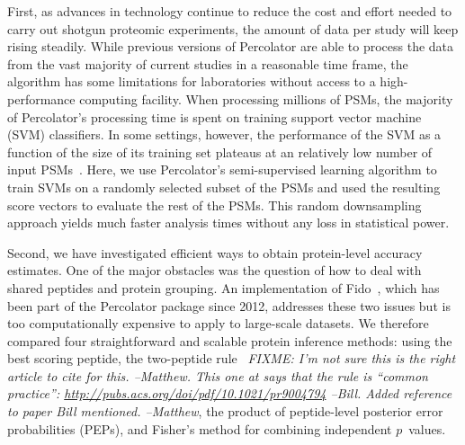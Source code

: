 \documentclass{article}
\begin{document}
First, as advances in technology continue to reduce the cost and
effort needed to carry out shotgun proteomic experiments, the amount
of data per study will keep rising steadily. While previous versions
of Percolator are able to process the data from the vast majority of
current studies in a reasonable time frame, the algorithm has some
limitations for laboratories without access to a high-performance
computing facility. When processing millions of PSMs, the majority of
Percolator's processing time is spent on training support vector
machine (SVM) classifiers.  In some settings, however, the performance
of the SVM as a function of the size of its training set plateaus at
an relatively low number of input PSMs~\cite{gonnelli2015decoy}. Here,
we use Percolator's semi-supervised learning algorithm to train SVMs
on a randomly selected subset of the PSMs and used the resulting score
vectors to evaluate the rest of the PSMs.  This random downsampling
approach yields much faster analysis times without any loss in
statistical power.

Second, we have investigated efficient ways to obtain protein-level 
accuracy estimates. One of the major obstacles was the question of how 
to deal with shared peptides and protein grouping. An implementation 
of Fido~\cite{serang2010efficient}, which has been part of the 
Percolator package since 2012, addresses these two issues but is too 
computationally expensive to apply to large-scale datasets. We 
therefore compared four straightforward and scalable protein inference 
methods: using the best scoring peptide, the two-peptide 
rule~\cite{carr2004need, gupta2009false} {\em FIXME: I'm not sure this 
is the right article to cite for this. --Matthew.  This one at says 
that the rule is ``common practice'': 
\url{http://pubs.acs.org/doi/pdf/10.1021/pr9004794} --Bill. Added 
reference to paper Bill mentioned. --Matthew}, the product of 
peptide-level posterior error probabilities (PEPs), and Fisher's 
method for combining independent $p$~values.
\end{document}
